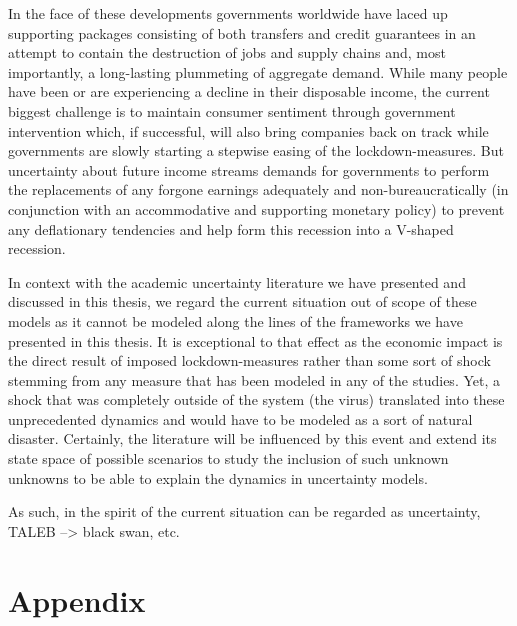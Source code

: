 \documentclass[a4paper,11pt,listof=nochaptergap,oneside,pointednumbers,bibtotoc,bigheadings,liststotoc]{scrbook}
\theoremstyle{mysatz}
\theoremstyle{mydefinition}
\theoremstyle{mytheorem}
\theoremstyle{mybemerkung}
\begin{document}
In the face of these developments governments worldwide have laced up supporting packages consisting of both transfers and credit guarantees in an attempt to contain the destruction of jobs and supply chains and, most importantly, a long-lasting plummeting of aggregate demand. While many people have been or are experiencing a decline in their disposable income, the current biggest challenge is to maintain consumer sentiment through government intervention which, if successful, will also bring companies back on track while governments are slowly starting a stepwise easing of the lockdown-measures. But uncertainty about future income streams demands for governments to perform the replacements of any forgone earnings adequately and non-bureaucratically (in conjunction with an accommodative and supporting monetary policy) to prevent any deflationary tendencies and help form this recession into a V-shaped recession.

In context with the academic uncertainty literature we have presented and discussed in this thesis, we regard the current situation out of scope of these models as it cannot be modeled along the lines of the frameworks we have presented in this thesis. It is exceptional to that effect as the economic impact is the direct result of imposed lockdown-measures rather than some sort of shock stemming from any measure that has been modeled in any of the studies. Yet, a shock that was completely outside of the system (the virus) translated into these unprecedented dynamics and would have to be modeled as a sort of natural disaster. Certainly, the literature will be influenced by this event and extend its state space of possible scenarios to study the inclusion of such unknown unknowns to be able to explain the dynamics in uncertainty models.

As such, in the spirit of \citet{keynes:37} the current situation can be regarded as uncertainty, TALEB --> black swan, etc.


\newpage
\appendix


\chapter{Appendix}
\label{VARAndLocalProjection}
\end{document}
